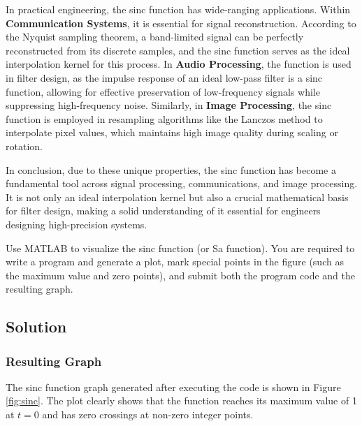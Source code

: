 \documentclass[12pt, a4paper, twoside]{ctexart}
\begin{document}
In practical engineering, the sinc function has wide-ranging applications. Within \textbf{Communication Systems}, it is essential for signal reconstruction. According to the Nyquist sampling theorem, a band-limited signal can be perfectly reconstructed from its discrete samples, and the sinc function serves as the ideal interpolation kernel for this process. In \textbf{Audio Processing}, the function is used in filter design, as the impulse response of an ideal low-pass filter is a sinc function, allowing for effective preservation of low-frequency signals while suppressing high-frequency noise. Similarly, in \textbf{Image Processing}, the sinc function is employed in resampling algorithms like the Lanczos method to interpolate pixel values, which maintains high image quality during scaling or rotation.

In conclusion, due to these unique properties, the sinc function has become a fundamental tool across signal processing, communications, and image processing. It is not only an ideal interpolation kernel but also a crucial mathematical basis for filter design, making a solid understanding of it essential for engineers designing high-precision systems.

\vspace{50pt}
\begin{problem}
    \heiti{} Use MATLAB to visualize the sinc function (or Sa function). You are required to write a program and generate a plot, mark special points in the figure (such as the maximum value and zero points), and submit both the program code and the resulting graph.
\end{problem}

\vspace{5pt} %
\subsection*{\heiti{}Solution}

\subsubsection*{\heiti{}Resulting Graph}
The sinc function graph generated after executing the code is shown in Figure \ref{fig:sinc}. The plot clearly shows that the function reaches its maximum value of 1 at $t=0$ and has zero crossings at non-zero integer points.
\end{document}
